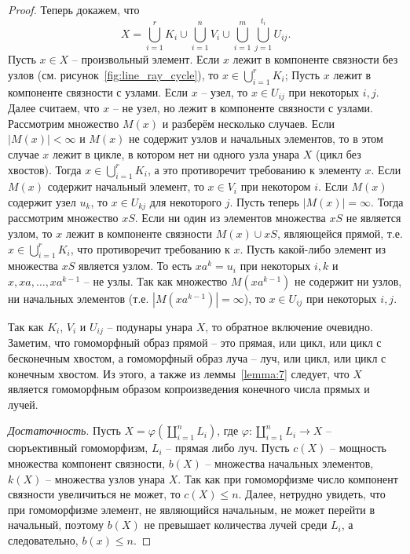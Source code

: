 \documentclass[11pt,twoside,final
]{article}
\begin{document}
\begin{proof}
	Теперь докажем, что
	\[
		X = \bigcup_{i = 1}^r K_i \cup \bigcup_{i = 1}^n V_i \cup \bigcup_{i = 1}^m \bigcup_{j = 1}^{t_i} U_{ij}.
	\]
	Пусть $x \in X$ -- произвольный элемент.
	Если $x$ лежит в компоненте связности без узлов (см. рисунок~\ref{fig:line_ray_cycle}), то $x \in \bigcup_{i = 1}^r K_i$;
	Пусть $x$ лежит в компоненте связности с узлами.
	Если $x$ -- узел, то $x \in U_{ij}$ при некоторых $i,j$.
	Далее считаем, что $x$ -- не узел, но лежит в компоненте связности с узлами.
	Рассмотрим множество $M(x)$ и разберём несколько случаев.
	Если $|M(x)| < \infty $ и $M(x)$ не содержит узлов и начальных элементов, то в этом случае $x$ лежит в цикле, в котором нет ни одного узла унара $X$ (цикл без хвостов).
	Тогда $x \in \bigcup_{i = 1}^r K_i$, а это противоречит требованию к элементу $x$.
	Если $M(x)$ содержит начальный элемент, то $x \in V_i$ при некотором $i$.
	Если $M(x)$ содержит узел $u_k$, то $x \in U_{kj}$ для некоторого $j$.
	Пусть теперь $|M(x)| = \infty$.
	Тогда рассмотрим множество $x S$.
	Если ни один из элементов множества $x S$ не является узлом, то $x$ лежит в компоненте связности $M(x) \cup xS$, являющейся прямой, т.е. $x \in \bigcup_{i = 1}^r K_i$, что противоречит требованию к $x$.
	Пусть какой-либо элемент из множества $xS$ является узлом.
	То есть $x a^k = u_i$ при некоторых $i,k$ и $x, xa, \ldots, xa^{k - 1}$ -- не узлы.
	Так как множество $M(x a^{k - 1})$ не содержит ни узлов, ни начальных элементов (т.е. $|M(x a^{k - 1})| = \infty$), то $x \in U_{ij}$ при некоторых $i,j$.

	Так как $K_i$, $V_i$ и $U_{ij}$ -- подунары унара $X$, то обратное включение очевидно.
	Заметим, что гомоморфный образ прямой -- это прямая, или цикл, или цикл с бесконечным хвостом, а гомоморфный образ луча -- луч, или цикл, или цикл с конечным хвостом.
	Из этого, а также из леммы~\ref{lemma:7} следует, что $X$ является гомоморфным образом копроизведения конечного числа прямых и лучей.

	\textit{Достаточность}.
	Пусть $X = \varphi(\coprod_{i = 1}^{n} L_i)$, где $\varphi: \coprod_{i = 1}^{n} L_i \rightarrow X$ -- сюръективный гомоморфизм, $L_i$ -- прямая либо луч.
	Пусть $c(X)$ -- мощность множества компонент связности, $b(X)$ -- множества начальных элементов, $k(X)$ -- множества узлов унара $X$.
	Так как при гомоморфизме число компонент связности увеличиться не может, то $c(X) \leqslant n$.
	Далее, нетрудно увидеть, что при гомоморфизме элемент, не являющийся начальным, не может перейти в начальный, поэтому $b(X)$ не превышает количества лучей среди $L_i$, а следовательно, $b(x) \leqslant n$.


\end{proof}
\end{document}
